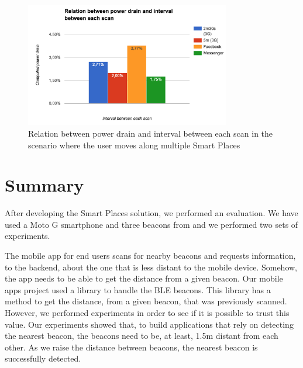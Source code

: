 \begin{figure}[!ht]
  \centering
    \includegraphics[width=0.8\textwidth, keepaspectratio]{images/results_battery_walking}
    \caption[Power drain when the user is moving]{Relation between power drain and interval between each scan in the scenario where the user moves along multiple Smart Places}
    \label{fig:results_battery_walking}
\end{figure}

\section{Summary}
\label{sec:evaluation_summary}
After developing the Smart Places solution, we performed an evaluation.
We have used a  Moto G smartphone and three beacons from  and we performed two sets of experiments.

The mobile app for end users scans for nearby beacons and requests information, to the backend, about the one that is less distant to the mobile device.
Somehow, the app needs to be able to get the distance from a given beacon.
Our mobile apps project used a library to handle the \gls{BLE} beacons. This library has a method to get the distance, from a given beacon, that was previously scanned.
However, we performed experiments in order to see if it is possible to trust this value.
Our experiments showed that, to build applications that rely on detecting the nearest beacon, the beacons need to be, at least, 1.5m distant from each other.
As we raise the distance between beacons, the nearest beacon is successfully detected.

